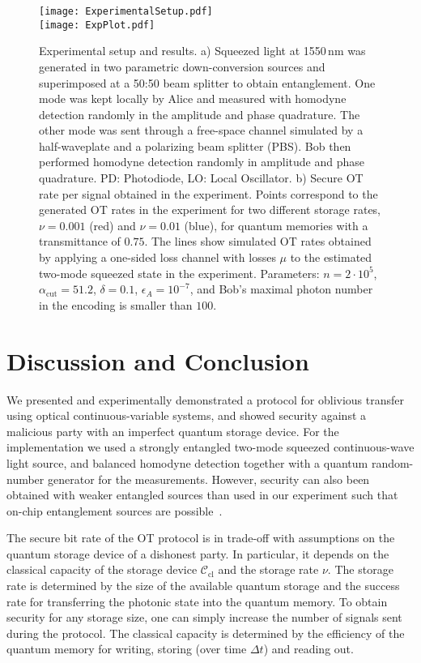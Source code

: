 \documentclass[aps,amsfonts,twoside,amssymb,superscriptaddress,twocolumn]{revtex4-1}
\newcommand*{\cC}{\mathcal{C}}
\newcommand*{\cl}{\textrm{cl}}
\begin{document}
\begin{figure}
    \begin{center}
        \texttt{[image: ExperimentalSetup.pdf]}\\
        \texttt{[image: ExpPlot.pdf]}
        \caption{Experimental setup and results. a) Squeezed light at 1550\,nm was generated in two parametric down-conversion sources and superimposed at a 50:50 beam splitter to obtain entanglement. One mode was kept locally by Alice and measured with homodyne detection randomly in the amplitude and phase quadrature. The other mode was sent through a free-space channel simulated by a half-waveplate and a polarizing beam splitter (PBS). Bob then performed homodyne detection randomly in amplitude and phase quadrature. PD: Photodiode, LO: Local Oscillator. b) Secure OT rate per signal obtained in the experiment. Points correspond to the generated OT rates in the experiment for two different storage rates, $\nu=0.001$ (red) and $\nu=0.01$ (blue), for quantum memories with a transmittance of $0.75$. The lines show simulated OT rates obtained by applying a one-sided loss channel with losses $\mu$ to the estimated two-mode squeezed state in the experiment. Parameters: $n=2\cdot 10^5$, $\alpha_\text{cut} = 51.2$, $\delta = 0.1$, $\epsilon_A = 10^{-7}$, and Bob's maximal photon number in the encoding is smaller than $100$.
}
    \label{fig:ExpPlot} 
    \end{center}
\end{figure}


\section{Discussion and Conclusion} 
We presented and experimentally demonstrated a protocol for oblivious transfer using optical continuous-variable systems, and showed security against a malicious party with an imperfect quantum storage device. For the implementation we used a strongly entangled two-mode squeezed continuous-wave light source, and balanced homodyne detection together with a quantum random-number generator for the measurements. However, security can also been obtained with weaker entangled sources than used in our experiment such that on-chip entanglement sources are possible~\cite{masada2015}. 

The secure bit rate of the OT protocol is in trade-off with assumptions on the quantum storage device of a dishonest party. In particular, it depends on the classical capacity of the storage device $\cC_\cl$ and the storage rate $\nu$. The storage rate is determined by the size of the available quantum storage and the success rate for transferring the photonic state into the quantum memory. To obtain security for any storage size, one can simply increase the number of signals sent during the protocol. The classical capacity is determined by the efficiency of the quantum memory for writing, storing (over time $\Delta t$) and reading out. 
\end{document}
